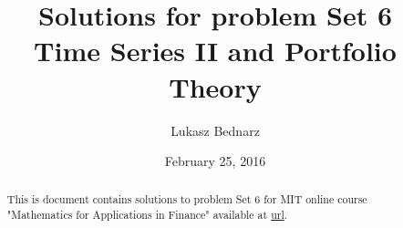 \documentclass[fleqn]{amsart}
\begin{document}
\def\mathbi#1{\textbf{\em #1}}

\title[Problem Set 5]{Solutions for problem Set 6 \\ Time Series II and Portfolio Theory}
\author{Lukasz Bednarz}
\date{February 25, 2016}
\begin{abstract}
This is document contains solutions to problem Set 6 for MIT online course "Mathematics for Applications in Finance" available at 
\href{http://ocw.mit.edu/courses/mathematics/18-s096-topics-in-mathematics-with-applications-in-finance-fall-2013/index.htm}{url}.

\end{abstract}
\maketitle

\section{}


\section{}





\end{document}
